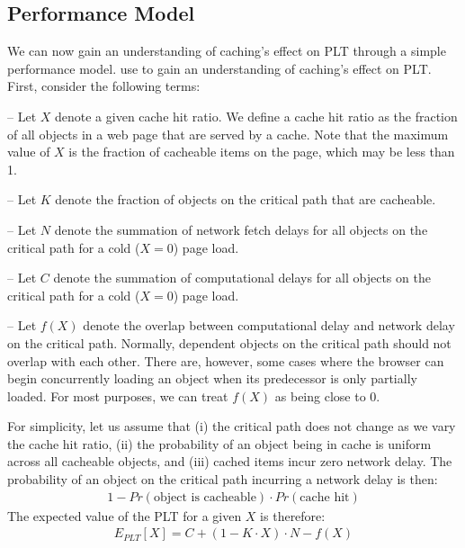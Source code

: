 \subsection{Performance Model}
\label{subsec:model}
We can now gain an understanding of caching's effect on PLT through a simple performance model.
use to gain an understanding of caching's effect on PLT.
First, consider the following terms:

\noindent-- Let $X$ denote a given cache hit ratio. We define a cache hit ratio as the fraction
of all objects in a web page that are served by a cache. Note that the maximum
value of $X$ is the fraction of cacheable items on the page, which may be less than 1.

\noindent-- Let $K$ denote the fraction of objects on the critical path that
are cacheable.

\noindent-- Let $N$ denote the summation of network fetch delays for all objects on the
critical path for a cold ($X=0$) page load.

\noindent-- Let $C$ denote the summation of computational delays for all
objects on the critical path for a cold ($X=0$) page load.

\noindent-- Let $f(X)$ denote the overlap between computational delay and
network delay on the critical path. Normally, dependent objects on the
critical path should not overlap with each other. There are, however, some cases where the browser can begin concurrently loading an object
when its predecessor is only partially loaded.
For most purposes, we can treat $f(X)$
as being close to 0.

For simplicity, let us assume that (i) the critical path does not change as we vary the cache hit
ratio, (ii) the probability of an object being in cache is uniform
across all cacheable objects, and (iii) cached items incur zero network delay. The probability of an object
on the critical path incurring a network delay is then:
\begin{align*}
1 - Pr(\text{object is cacheable}) \cdot Pr(\text{cache hit})
\end{align*}
The expected value of the PLT for a given $X$ is therefore:
\begin{align*}
E_{PLT}[X] = C + (1 - K \cdot X) \cdot N - f(X)
\end{align*}


